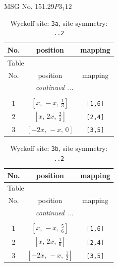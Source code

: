 \documentclass[fleqn,8pt]{jsarticle}
\begin{document}
\setcounter{MaxMatrixCols}{32}

\renewcommand{\tablename}{Table~}
\renewcommand{\figurename}{Figure~}
\begin{center}
\LARGE
MSG No. 151.29\quad$P3_{1}12$
\end{center}
\renewcommand{\arraystretch}{1.2}
\begin{longtable}{ccc}
\caption{Wyckoff site: {\tt 3a}, site symmetry: {\tt ..2}}
 \\
 \hline \hline
No. & position & mapping \\ \hline \endfirsthead

\multicolumn{2}{l}{\tablename\ \thetable{}} \\
 \hline \hline
No. & position & mapping \\ \hline \endhead

 \hline \hline
\multicolumn{2}{r}{\footnotesize\it continued ...} \\ \endfoot

 \hline \hline
\multicolumn{2}{r}{} \\ \endlastfoot

1 & $\left[ x,\, - x,\, \frac{1}{3} \right]$ & {\tt [1,6]} \\ \hline
2 & $\left[ x,\, 2 x,\, \frac{2}{3} \right]$ & {\tt [2,4]} \\ \hline
3 & $\left[ - 2 x,\, - x,\, 0 \right]$ & {\tt [3,5]} \\
\end{longtable}
\renewcommand{\arraystretch}{1.2}
\begin{longtable}{ccc}
\caption{Wyckoff site: {\tt 3b}, site symmetry: {\tt ..2}}
 \\
 \hline \hline
No. & position & mapping \\ \hline \endfirsthead

\multicolumn{2}{l}{\tablename\ \thetable{}} \\
 \hline \hline
No. & position & mapping \\ \hline \endhead

 \hline \hline
\multicolumn{2}{r}{\footnotesize\it continued ...} \\ \endfoot

 \hline \hline
\multicolumn{2}{r}{} \\ \endlastfoot

1 & $\left[ x,\, - x,\, \frac{5}{6} \right]$ & {\tt [1,6]} \\ \hline
2 & $\left[ x,\, 2 x,\, \frac{1}{6} \right]$ & {\tt [2,4]} \\ \hline
3 & $\left[ - 2 x,\, - x,\, \frac{1}{2} \right]$ & {\tt [3,5]} \\
\end{longtable}
\end{document}
